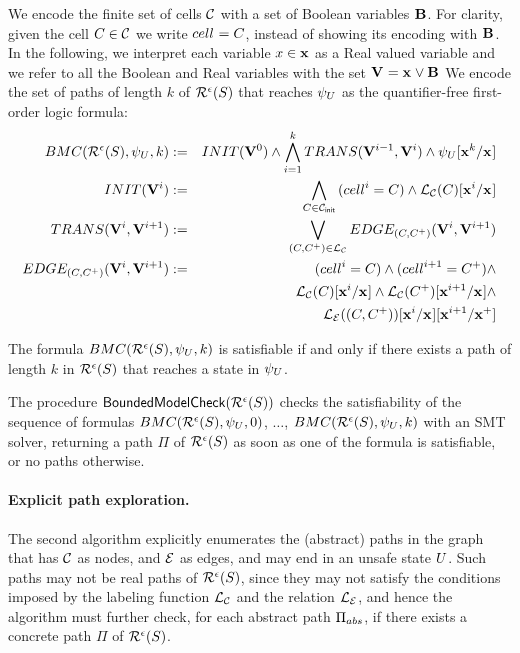 We encode the finite set of cells $\mathcal{C}$ with a set of Boolean
variables ${\mathbf{B}}^{}$. For clarity, given the cell $C \in \mathcal{C}$ we
write ${cell}^{} = C$, instead of showing its encoding with ${\mathbf{B}}^{}$.
%
In the following, we interpret each variable $x \in \mathbf{x}$ as a Real
valued variable and we refer to all the Boolean and Real variables
with the set ${\mathbf{V}}^{} = {\mathbf{x}}^{} \vee {\mathbf{B}}^{}$
%
We encode the set of paths of length $k$ of
$\mathcal{R}^{\epsilon}(S)$ that reaches ${\psi}_{U}$
as the quantifier-free first-order logic formula:
\begin{eqnarray*}
BMC(\mathcal{R}^{\epsilon}(S), {\psi}_{U}, k) & := &
INIT({\mathbf{V}}^{0}) \wedge
\bigwedge_{i=1}^{k}{TRANS({\mathbf{V}}^{i-1}, {\mathbf{V}}^{i})} \wedge
{\ensuremath{{\psi}_{U}}}[{{\mathbf{x}}^{k}}/{{\mathbf{x}}^{}}]\\
INIT({\mathbf{V}}^{i}) & := &
\bigwedge_{C \in \mathcal{C}_{\mathsf{init}}}{({cell}^{i} = C) \wedge
{\ensuremath \mathcal{L}_\ensuremath \mathcal{C}(C)}[{{\mathbf{x}}^{i}}/{{\mathbf{x}}^{}}]
}
\\
TRANS({\mathbf{V}}^{i}, {\mathbf{V}}^{i+1}) & := &
  \bigvee_{(C,C^+) \in \mathcal{L}_\mathcal{C}}{
    EDGE_{(C,C^+)}({\mathbf{V}}^{i}, {\mathbf{V}}^{i+1})
  } \\
EDGE_{(C,C^+)}({\mathbf{V}}^{i}, {\mathbf{V}}^{i+1}) & := &
({cell}^{i} = C) \wedge ({cell}^{i+1} = C^+) \wedge  \\
&& {\mathcal{L}_\mathcal{C}(C)}[{{\mathbf{x}}^{i}}/{{\mathbf{x}}^{}}] \wedge
   {\ensuremath \mathcal{L}_\ensuremath \mathcal{C}(C^+)}[{{\mathbf{x}}^{i+1}}/{{\mathbf{x}}^{}}] \wedge \\
&& {{\mathcal{L}_\mathcal{E}((C,C^+))}[{{\mathbf{x}}^{i}}/{{\mathbf{x}}^{}}]}[{{\mathbf{x}}^{i+1}}/{{{\mathbf{x}}^{+}}}]
\end{eqnarray*}

The formula
$BMC(\mathcal{R}^{\epsilon}(S), {\psi}_{U}, k)$ is satisfiable
if and only if there exists a path of length $k$ in 
$\mathcal{R}^{\epsilon}(S)$ that reaches a state in ${\psi}_{U}$.

The procedure
$\mathsf{BoundedModelCheck}(\mathcal{R}^{\epsilon}(S))$
checks the satisfiability of the sequence of formulas 
$BMC(\mathcal{R}^{\epsilon}(S), {\psi}_{U}, 0)$, 
$\ldots$,
$BMC(\mathcal{R}^{\epsilon}(S), {\psi}_{U}, k)$
with an SMT solver, returning a path $\Pi$ of
$\mathcal{R}^{\epsilon}(S)$ as soon as one of the formula is
satisfiable, or no paths otherwise.

\paragraph{Explicit path exploration.}
The second algorithm explicitly enumerates
the (abstract) paths in the graph that has $\mathcal{C}$
as nodes, and $\mathcal{E}$ as edges, and may end in an unsafe state
$U$.
%
Such paths may not be real paths of
$\mathcal{R}^{\epsilon}(S)$, since they may not satisfy the
conditions imposed by the labeling function $\mathcal{L}_\mathcal{C}$
and the relation $\mathcal{L}_\mathcal{E}$, and hence the algorithm must
further check, for each abstract path $\Pi_{abs}$, if there exists a 
concrete path $\Pi$ of
$\mathcal{R}^{\epsilon}(S)$.

